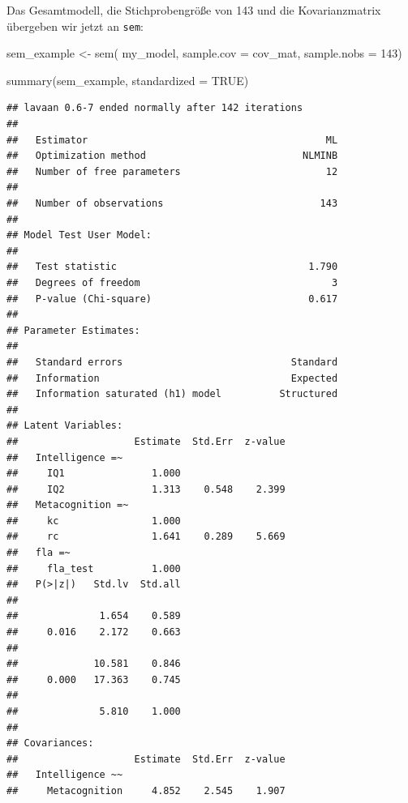 \documentclass[
]{book}
\newenvironment{Shaded}{\begin{snugshade}}{\end{snugshade}}
\newcommand{\AttributeTok}[1]{\textcolor[rgb]{0.77,0.63,0.00}{#1}}
\newcommand{\ConstantTok}[1]{\textcolor[rgb]{0.00,0.00,0.00}{#1}}
\newcommand{\DecValTok}[1]{\textcolor[rgb]{0.00,0.00,0.81}{#1}}
\newcommand{\FunctionTok}[1]{\textcolor[rgb]{0.00,0.00,0.00}{#1}}
\newcommand{\NormalTok}[1]{#1}
\newcommand{\OtherTok}[1]{\textcolor[rgb]{0.56,0.35,0.01}{#1}}
\begin{document}
Das Gesamtmodell, die Stichprobengröße von 143 und die Kovarianzmatrix übergeben wir jetzt an \texttt{sem}:

\begin{Shaded}
\begin{Highlighting}[]
\NormalTok{sem\_example }\OtherTok{\textless{}{-}} \FunctionTok{sem}\NormalTok{(}
\NormalTok{  my\_model,}
    \AttributeTok{sample.cov =}\NormalTok{ cov\_mat,}
    \AttributeTok{sample.nobs =} \DecValTok{143}\NormalTok{)}

\FunctionTok{summary}\NormalTok{(sem\_example, }\AttributeTok{standardized =} \ConstantTok{TRUE}\NormalTok{)}
\end{Highlighting}
\end{Shaded}

\begin{verbatim}
## lavaan 0.6-7 ended normally after 142 iterations
## 
##   Estimator                                         ML
##   Optimization method                           NLMINB
##   Number of free parameters                         12
##                                                       
##   Number of observations                           143
##                                                       
## Model Test User Model:
##                                                       
##   Test statistic                                 1.790
##   Degrees of freedom                                 3
##   P-value (Chi-square)                           0.617
## 
## Parameter Estimates:
## 
##   Standard errors                             Standard
##   Information                                 Expected
##   Information saturated (h1) model          Structured
## 
## Latent Variables:
##                    Estimate  Std.Err  z-value
##   Intelligence =~                            
##     IQ1               1.000                  
##     IQ2               1.313    0.548    2.399
##   Metacognition =~                           
##     kc                1.000                  
##     rc                1.641    0.289    5.669
##   fla =~                                     
##     fla_test          1.000                  
##   P(>|z|)   Std.lv  Std.all
##                            
##              1.654    0.589
##     0.016    2.172    0.663
##                            
##             10.581    0.846
##     0.000   17.363    0.745
##                            
##              5.810    1.000
## 
## Covariances:
##                    Estimate  Std.Err  z-value
##   Intelligence ~~                            
##     Metacognition     4.852    2.545    1.907

\end{verbatim}
\end{document}
